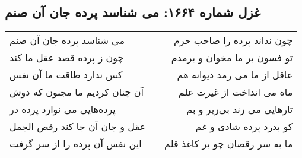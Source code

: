 \begin{center}
\section*{غزل شماره ۱۶۶۴: می شناسد پرده جان آن صنم}
\label{sec:1664}
\begin{longtable}{l p{0.5cm} r}
می شناسد پرده جان آن صنم
&&
چون نداند پرده را صاحب حرم
\\
چون ز پرده قصد عقل ما کند
&&
تو فسون بر ما مخوان و برمدم
\\
کس ندارد طاقت ما آن نفس
&&
عاقل از ما می رمد دیوانه هم
\\
آن چنان کردیم ما مجنون که دوش
&&
ماه می انداخت از غیرت علم
\\
پرده‌هایی می نوازد پرده در
&&
تارهایی می زند بی‌زیر و بم
\\
عقل و جان آن جا کند رقص الجمل
&&
کو بدرد پرده شادی و غم
\\
این نفس آن پرده را از سر گرفت
&&
ما به سر رقصان چو بر کاغذ قلم
\\
\end{longtable}
\end{center}

